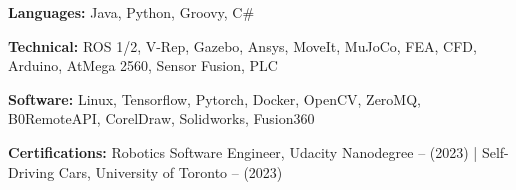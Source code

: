 
\begin{cvskills}

  \cvskill
    { \bf Languages:} %
    { Java, Python, Groovy, C\#}

  \cvskill
    {\bf Technical:} %
    { ROS 1/2, V-Rep, Gazebo, Ansys, MoveIt, MuJoCo, FEA, CFD, Arduino, AtMega 2560, Sensor Fusion, PLC}

  \cvskill
    {\bf Software:} %
    { Linux, Tensorflow, Pytorch, Docker, OpenCV, ZeroMQ, B0RemoteAPI, CorelDraw, Solidworks, Fusion360}

  \cvskill
    {\bf Certifications:} %
    { Robotics Software Engineer, Udacity Nanodegree -- (2023) | Self-Driving Cars, University of Toronto -- (2023)}


\end{cvskills}
